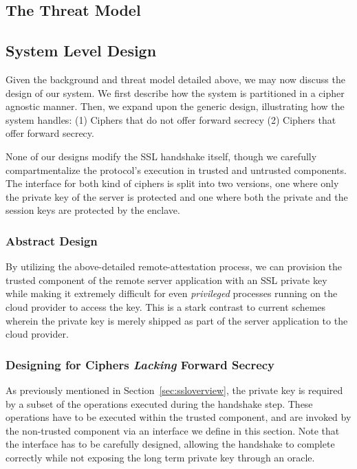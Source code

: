 \documentclass[../main.tex]{subfiles}
\begin{document}
\subsection{The Threat Model}


\subsection{System Level Design} %

Given the background and threat model detailed above, we may now
discuss the design of our system. We first describe how the system is
partitioned in a cipher agnostic manner. Then, we expand upon the
generic design, illustrating how the system handles: (1) Ciphers that
do not offer forward secrecy (2) Ciphers that offer forward secrecy.


None of our designs modify the SSL handshake itself, though we carefully
compartmentalize the protocol's execution in trusted and untrusted
components. The interface for both kind of ciphers is split into two
versions, one where only the private key of the server is protected
and one where both the private and the session keys are protected by
the enclave.

\subsubsection{Abstract Design}
By utilizing the above-detailed remote-attestation process, we can
provision the trusted component of the remote server application with
an SSL private key while making it extremely difficult for even
\textit{privileged} processes running on the cloud provider to access
the key. This is a stark contrast to current schemes wherein the
private key is merely shipped as part of the server application to the
cloud provider.

\subsubsection{Designing for Ciphers \textit{Lacking} Forward Secrecy}
As previously mentioned in Section~\ref{sec:ssloverview}, the
private key is required by a subset of the operations executed during
the handshake step. These operations have to be executed within the
trusted component, and are invoked by the non-trusted component via an
interface we define in this section. Note that the interface has
to be carefully designed, allowing the handshake to complete correctly
while not exposing the long term private key through an oracle. 
\end{document}
